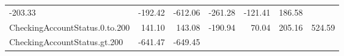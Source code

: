 \documentclass[]{article}
\begin{document}
\begin{longtable}[]{@{}lrrrrrr@{}}
\begin{minipage}[t]{0.10\columnwidth}
-203.33\strut
\end{minipage} & \begin{minipage}[t]{0.08\columnwidth}\raggedleft\strut
-192.42\strut
\end{minipage} & \begin{minipage}[t]{0.08\columnwidth}\raggedleft\strut
-612.06\strut
\end{minipage} & \begin{minipage}[t]{0.08\columnwidth}\raggedleft\strut
-261.28\strut
\end{minipage} & \begin{minipage}[t]{0.08\columnwidth}\raggedleft\strut
-121.41\strut
\end{minipage} & \begin{minipage}[t]{0.08\columnwidth}\raggedleft\strut
186.58\strut
\end{minipage}\tabularnewline
\begin{minipage}[t]{0.31\columnwidth}\raggedright\strut
CheckingAccountStatus.0.to.200\strut
\end{minipage} & \begin{minipage}[t]{0.10\columnwidth}\raggedleft\strut
141.10\strut
\end{minipage} & \begin{minipage}[t]{0.08\columnwidth}\raggedleft\strut
143.08\strut
\end{minipage} & \begin{minipage}[t]{0.08\columnwidth}\raggedleft\strut
-190.94\strut
\end{minipage} & \begin{minipage}[t]{0.08\columnwidth}\raggedleft\strut
70.04\strut
\end{minipage} & \begin{minipage}[t]{0.08\columnwidth}\raggedleft\strut
205.16\strut
\end{minipage} & \begin{minipage}[t]{0.08\columnwidth}\raggedleft\strut
524.59\strut
\end{minipage}\tabularnewline
\begin{minipage}[t]{0.31\columnwidth}\raggedright\strut
CheckingAccountStatus.gt.200\strut
\end{minipage} & \begin{minipage}[t]{0.10\columnwidth}\raggedleft\strut
-641.47\strut
\end{minipage} & \begin{minipage}[t]{0.08\columnwidth}\raggedleft\strut
-649.45\strut
\end{minipage} & \begin{minipage}[t]{0.08\columnwidth}\raggedleft\strut

\end{minipage}
\end{longtable}
\end{document}
